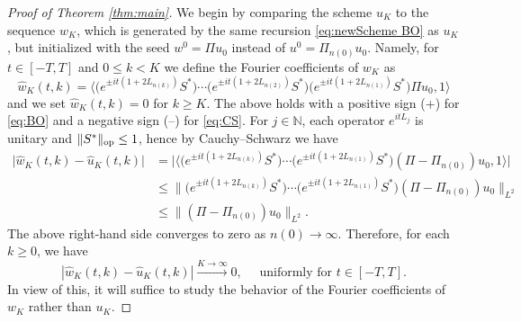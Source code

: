 \documentclass [11pt] {article}
\newcommand{\<}{\langle}
\renewcommand{\>}{\rangle}
\newcommand{\wh}[1]{\widehat{#1}}
\newcommand{\op}{\textup{op}}
\begin{document}
\begin{proof}[Proof of Theorem \ref{thm:main}]
%
We begin by comparing the scheme $ u_K $ to the sequence $ w_K $, which is generated by the same recursion \eqref{eq:newScheme BO} as $ u_K $, but initialized with the seed $ w^0 = \Pi u_0 $ instead of $ u^0 = \Pi_{n(0)} u_0 $.
%
Namely, for $t \in [-T,T]$ and $0\leq k<K$ we define the Fourier coefficients of $w_K$ as
\begin{equation*}
\wh{w}_K(t,k) = \big\langle (e^{\pm it(1+2L_{n(k)})}S^{*}\big) \cdots \big(e^{\pm it(1+2L_{n(2)})}S^{*}\big) \big(e^{\pm it(1+2L_{n(1)})}S^{*}\big) \Pi u_0 , 1 \big\rangle 
\end{equation*}
and we set $\wh{w}_K(t,k) = 0$ for $k\geq K$. The above holds with a positive sign (+) for \eqref{eq:BO} and a negative sign (--)  for \eqref{eq:CS}.  For $j\in\mathbb{N}$, each operator $e^{itL_j}$ is unitary and $\|S^{*} \|_\op\le 1$, hence by Cauchy--Schwarz we have
\begin{align*}
\big| \widehat{w}_{K}(t,k) - \widehat{u}_K(t,k) \big| 
&= \big| \big\langle (e^{\pm it(1+2L_{n(k)})}S^{*}\big) \cdots \big(e^{\pm it(1+2L_{n(1)})}S^{*}\big) (\Pi - \Pi_{n(0)}) u_0 , 1 \big\rangle \big| \\
&\le \big\| (e^{\pm it(1+2L_{n(k)})}S^{*}\big) \cdots \big(e^{\pm it(1+2L_{n(1)})}S^{*}\big) (\Pi - \Pi_{n(0)}) u_0 \big\|_{L^2} \\
&\leq \| (\Pi - \Pi_{n(0)}) u_0 \big\|_{L^2} .
\end{align*}
The above right-hand side converges to zero as $n(0)\to\infty$. 
Therefore, for each $k\geq 0$, we have
\begin{equation}
|\widehat{w}_{K}(t,k) - \wh{u}_K(t,k)| \xrightarrow{ K\to\infty} %
0, \quad \text{ uniformly for }t\in [-T,T] .
\label{vk to wk}
\end{equation}
In view of this, it will suffice to study the behavior of the Fourier coefficients of $w_K$ rather than $u_K$.


\end{proof}
\end{document}
